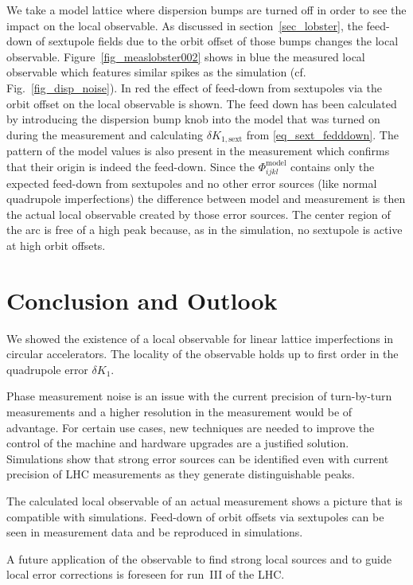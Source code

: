 We take a model lattice where dispersion bumps are turned off in order to see the impact on the 
local observable.
As discussed in section~\ref{sec_lobster}, the feed-down of sextupole fields due to the orbit offset
of those bumps changes the local observable.
Figure~\ref{fig_measlobster002} shows in blue the measured local observable which features similar
spikes as the simulation (cf. Fig.~\ref{fig_disp_noise}).
In red the effect of feed-down from sextupoles via the orbit offset on the local observable is shown.
The feed down has been calculated by introducing the dispersion bump knob into the model that was turned
on during the measurement and calculating $\delta K_{1, \text{sext}}$ from \eqref{eq_sext_fedddown}.
The pattern of the model
values is also present in the measurement which confirms that their origin is indeed the feed-down.
Since the $\Phi_{ijkl}^\text{model}$ contains only the expected feed-down from sextupoles and no other
error sources (like normal quadrupole imperfections) the difference between model and measurement is
then the actual local observable created by those error sources.
The center region of the arc is free of a high peak because, as in the simulation, no sextupole is 
active at high orbit offsets.

\section{Conclusion and Outlook}

We showed the existence of a local observable for linear lattice imperfections in circular
accelerators. The locality of the observable holds up to first order in the quadrupole error
$\delta K_1$. 

Phase measurement noise is an issue with the current precision of turn-by-turn measurements and a
higher resolution in the measurement would be of advantage. For certain use cases, new techniques are
needed to improve the control of the machine and hardware upgrades are a justified solution.
Simulations show that strong error sources can be identified even with current precision of LHC measurements
as they generate distinguishable peaks.

The calculated local observable of an actual measurement shows a picture that is compatible with simulations.
Feed-down of orbit offsets via sextupoles can be seen in measurement data and be reproduced in simulations.

A future application of the observable to find strong local sources and to guide local error corrections
is foreseen for run~III of the LHC.

